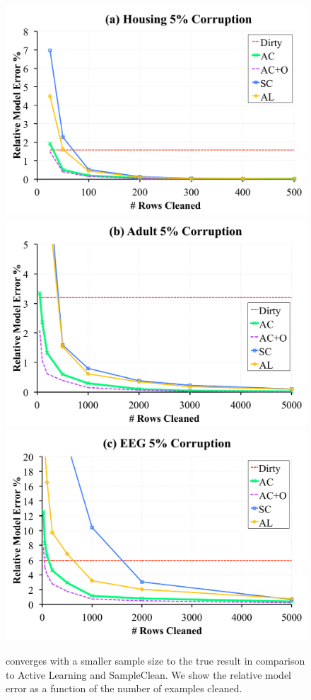 \begin{figure}[t]
\centering
 \includegraphics[scale=0.15]{exp/exp3a.pdf}
 \includegraphics[scale=0.15]{exp/exp3b.pdf}
  \includegraphics[scale=0.15]{exp/exp3c.pdf}
 \caption{\sys converges with a smaller sample size to the true result in comparison to Active Learning and SampleClean. We show the relative model error as a function of the number of examples cleaned. \label{prio-perf}}
\end{figure}

